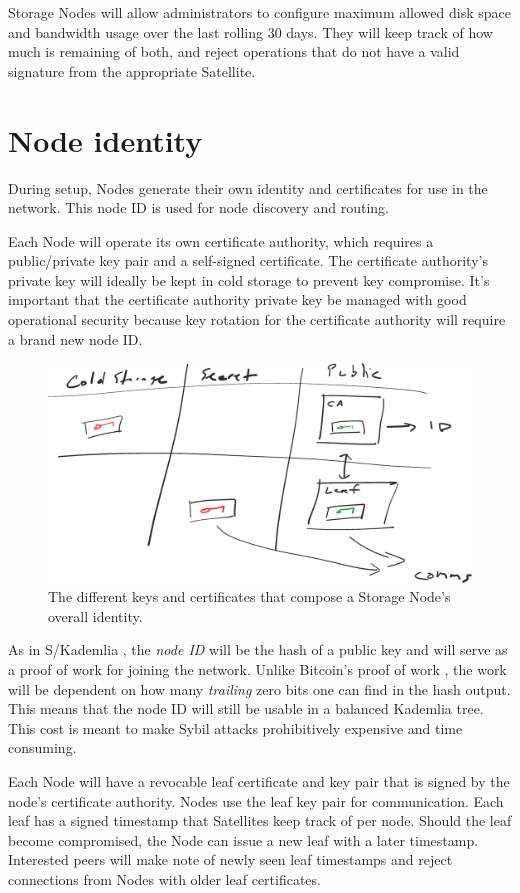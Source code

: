 \documentclass[8pt,fleqn,openany]{book}
\begin{document}
Storage Nodes will allow administrators to configure maximum allowed disk
space and bandwidth usage over the last rolling 30 days.
They will keep track of how much is remaining of both, and reject operations
that do not have a valid signature from the appropriate Satellite.

\section{Node identity}\label{sec:node-id}

During setup, Nodes generate their own identity and certificates for use in
the network.
This node ID is used for node discovery and routing.

Each Node will operate its own certificate authority, which requires a
public/private key pair and a self-signed certificate. The certificate
authority's private key will ideally be kept in cold storage to prevent key
compromise.
It's important that the certificate authority private key be managed with good
operational security because key rotation for the certificate authority will
require a brand new node ID.

\begin{figure}
\centering
\includegraphics[width=.8\textwidth]{diagram-drafts/identity.eps}
\caption{The different keys and certificates that compose a Storage Node's
overall identity.}
\end{figure}

As in S/Kademlia \cite{skad}, the {\em node ID} will be the hash of a public key
and will serve as a proof of work for joining the network. Unlike Bitcoin's
proof of work \cite{bitcoin}, the work will be dependent on how many
{\em trailing}
zero bits one can find in the hash output. This means that the node ID will
still be usable in a balanced Kademlia \cite{kad} tree.
This cost is meant to make Sybil attacks prohibitively expensive and time
consuming.

Each Node will have a revocable leaf certificate and key pair that is signed by
the node's certificate authority. Nodes use the leaf key pair for
communication. Each leaf has a signed timestamp that Satellites
keep track of per node. Should the leaf become compromised, the Node can issue
a new leaf with a later timestamp. Interested peers will make note of newly
seen leaf timestamps and reject connections from Nodes with older leaf
certificates.
\end{document}
